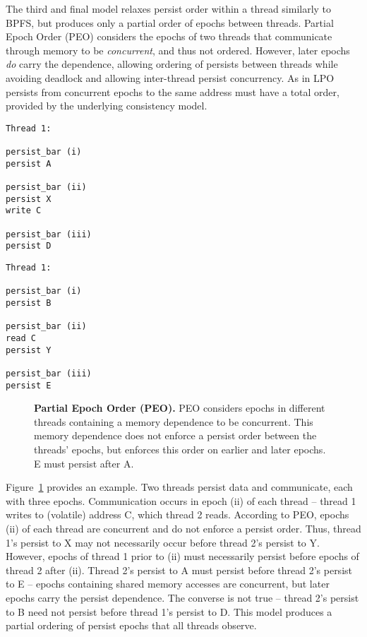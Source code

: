 The third and final model relaxes persist order within a thread similarly to BPFS, but produces only a partial order of epochs between threads.
Partial Epoch Order (PEO) considers the epochs of two threads that communicate through memory to be \emph{concurrent}, and thus not ordered.
However, later epochs \emph{do} carry the dependence, allowing ordering of persists between threads while avoiding deadlock and allowing inter-thread persist concurrency.
As in LPO persists from concurrent epochs to the same address must have a total order, provided by the underlying consistency model.

{
\singlespacing
\newsavebox{\PEOThreadOne}
\begin{lrbox}{\PEOThreadOne}
  \begin{lstlisting}
Thread 1:

persist_bar (i)
persist A

persist_bar (ii)
persist X
write C

persist_bar (iii)
persist D
  \end{lstlisting}
\end{lrbox}

\newsavebox{\PEOThreadTwo}
\begin{lrbox}{\PEOThreadTwo}
  \begin{lstlisting}
Thread 1:

persist_bar (i)
persist B

persist_bar (ii)
read C
persist Y

persist_bar (iii)
persist E
  \end{lstlisting}
\end{lrbox}

\begin{figure}[]
\centering
\subfigure{ \usebox{\PEOThreadOne} }
\hspace{1 in}
\subfigure{ \usebox{\PEOThreadTwo} }
\caption{\textbf{Partial Epoch Order (PEO).} PEO considers epochs in different threads containing a memory dependence to be concurrent.  This memory dependence does not enforce a persist order between the threads' epochs, but enforces this order on earlier and later epochs.  E must persist after A.}
\label{fig:PEO}
\end{figure}
}

Figure~\ref{fig:PEO} provides an example.
Two threads persist data and communicate, each with three epochs.
Communication occurs in epoch (ii) of each thread -- thread 1 writes to (volatile) address C, which thread 2 reads.
According to PEO, epochs (ii) of each thread are concurrent and do not enforce a persist order.
Thus, thread 1's persist to X may not necessarily occur before thread 2's persist to Y.
However, epochs of thread 1 prior to (ii) must necessarily persist before epochs of thread 2 after (ii).
Thread 2's persist to A must persist before thread 2's persist to E -- epochs containing shared memory accesses are concurrent, but later epochs carry the persist dependence.
The converse is not true -- thread 2's persist to B need not persist before thread 1's persist to D.
This model produces a partial ordering of persist epochs that all threads observe.

